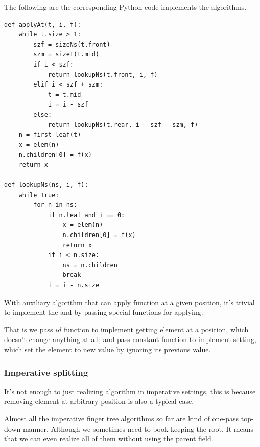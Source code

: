 \documentclass[b5paper]{article}
\begin{document}
The following are the corresponding Python code implements the algorithms.

\lstset{language=Python}
\begin{lstlisting}
def applyAt(t, i, f):
    while t.size > 1:
        szf = sizeNs(t.front)
        szm = sizeT(t.mid)
        if i < szf:
            return lookupNs(t.front, i, f)
        elif i < szf + szm:
            t = t.mid
            i = i - szf
        else:
            return lookupNs(t.rear, i - szf - szm, f)
    n = first_leaf(t)
    x = elem(n)
    n.children[0] = f(x)
    return x

def lookupNs(ns, i, f):
    while True:
        for n in ns:
            if n.leaf and i == 0:
                x = elem(n)
                n.children[0] = f(x)
                return x
            if i < n.size:
                ns = n.children
                break
            i = i - n.size
\end{lstlisting}

With auxiliary algorithm that can apply function at a given position, it's trivial to implement
the  and  by passing special functions for applying.

\begin{algorithmic}
  \State \Return {}
\EndFunction
\Statex
{}
  \State \Return {}
\EndFunction
\end{algorithmic}

That is we pass $id$ function to implement getting element at a position, which doesn't
change anything at all; and pass constant function to implement setting, which set the element
to new value by ignoring its previous value.

\subsubsection{Imperative splitting}

It's not enough to just realizing  algorithm in imperative settings, this
is because removing element at arbitrary position is also a typical case.

Almost all the imperative finger tree algorithms so far are kind of one-pass top-down manner.
Although we sometimes need to book keeping the root. It means that we can even realize all
of them without using the parent field.
\end{document}
